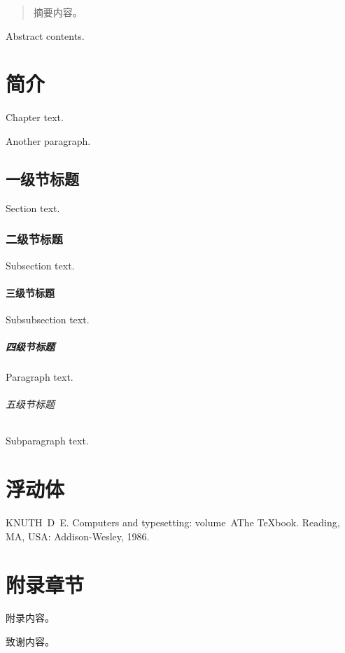 \frontmatter
{}

\begin{abstract}
  摘要内容。
\end{abstract}

\begin{abstract*}
  Abstract contents.
\end{abstract*}

\tableofcontents

\mainmatter
\chapter{简介}
Chapter text. \par
Another paragraph.
\section{一级节标题}
Section text.
\subsection{二级节标题}
Subsection text.
\subsubsection{三级节标题}
Subsubsection text.
\paragraph{四级节标题}
Paragraph text.
\subparagraph{五级节标题}
Subparagraph text.

\chapter{浮动体}
\cite{knuth86a}

\begin{thebibliography}{1}
KNUTH~D~E.
\newblock Computers and typesetting: volume~A\quad The
  {\TeX}book\allowbreak[M].
\newblock Reading, MA, USA: Addison-Wesley, 1986.
\end{thebibliography}

\appendix
\chapter{附录章节}
附录内容。

\backmatter
\begin{acknowledgements}
  致谢内容。
\end{acknowledgements}

